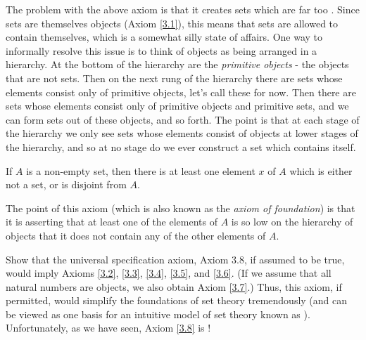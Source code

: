 The problem with the above axiom is that it creates sets which are far too .
Since sets are themselves objects (Axiom \ref{3.1}), this means that sets are allowed to contain themselves, which is a somewhat silly state of affairs.
One way to informally resolve this issue is to think of objects as being arranged in a hierarchy.
At the bottom of the hierarchy are the \emph{primitive objects} - the objects that are not sets.
Then on the next rung of the hierarchy there are sets whose elements consist only of primitive objects, let’s call these  for now.
Then there are sets whose elements consist only of primitive objects and primitive sets, and we can form sets out of these objects, and so forth.
The point is that at each stage of the hierarchy we only see sets whose elements consist of objects at lower stages of the hierarchy, and so at no stage do we ever construct a set which contains itself.

\begin{axiom}[Regularity]\label{3.9}
If \(A\) is a non-empty set, then there is at least one element \(x\) of \(A\) which is either not a set, or is disjoint from \(A\).
\end{axiom}

The point of this axiom (which is also known as the \emph{axiom of foundation}) is that it is asserting that at least one of the elements of \(A\) is so low on the hierarchy of objects that it does not contain any of the other elements of \(A\).

\exercisesection

\begin{exercise}\label{ex 3.2.1}
Show that the universal specification axiom, Axiom 3.8, if assumed to be true, would imply Axioms \ref{3.2}, \ref{3.3}, \ref{3.4}, \ref{3.5}, and \ref{3.6}.
(If we assume that all natural numbers are objects, we also obtain Axiom \ref{3.7}.)
Thus, this axiom, if permitted, would simplify the foundations of set theory tremendously (and can be viewed as one basis for an intuitive model of set theory known as ).
Unfortunately, as we have seen, Axiom \ref{3.8} is !
\end{exercise}

